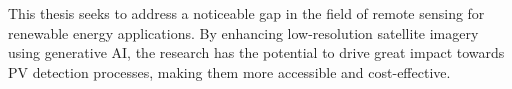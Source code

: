 This thesis seeks to address a noticeable gap in the field of remote sensing for renewable energy applications. By enhancing low-resolution satellite imagery using generative AI, the research has the potential to drive great impact towards PV detection processes, making them more accessible and cost-effective.








